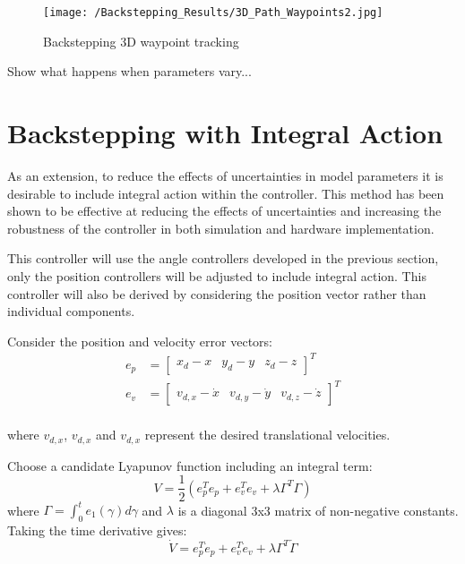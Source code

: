 \begin{figure}[htb]
\begin{center}
	\texttt{[image: /Backstepping\_Results/3D\_Path\_Waypoints2.jpg]}%
	\end{center}
	\caption{Backstepping 3D waypoint tracking}%
	\label{fig:Backstep_path}%
\end{figure}


Show what happens when parameters vary...
\FloatBarrier
\section{Backstepping with Integral Action}\label{section:IntBack}
As an extension, to reduce the effects of uncertainties in model parameters it is desirable to include integral action within the controller. This method has been shown to be effective at reducing the effects of uncertainties and increasing the robustness of the controller in both simulation \cite{Jasim2015} and hardware \cite{Bouabdallah2006} implementation.

This controller will use the angle controllers developed in the previous section, only the position controllers will be adjusted to include integral action. This controller will also be derived by considering the position vector rather than individual components.

Consider the position and velocity error vectors: 
\begin{equation*}
\begin{split}
e_{p}&=\begin{bmatrix}
x_{d}-x & y_{d}-y& z_{d}-z
\end{bmatrix}^{T}\\
e_{v}&=\begin{bmatrix}
v_{d,x}-\dot{x} & v_{d,y}-\dot{y}& v_{d,z}-\dot{z}
\end{bmatrix}^{T}\\
\end{split}
\end{equation*}

where $v_{d,x}$, $v_{d,x}$ and $v_{d,x}$ represent the desired translational velocities.

Choose a candidate Lyapunov function including an integral term:
\begin{equation}
V=\frac{1}{2}\left(e_{p}^{T}e_{p}+e_{v}^{T}e_{v}+\lambda\Gamma^{T}\Gamma\right)
\end{equation}
where $\Gamma=\int^{t}_{0} e_{1}(\gamma) d\gamma$ and $\lambda$ is a diagonal 3x3 matrix of non-negative constants.
Taking the time derivative gives:
\begin{equation}
\dot{V}=e_{p}^{T}\dot{e}_{p}+e_{v}^{T}\dot{e}_{v}+\lambda\Gamma^{T}\dot{\Gamma}
\end{equation}

